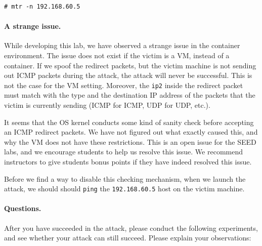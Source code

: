 \begin{lstlisting}
# mtr -n 192.168.60.5
\end{lstlisting}
 



\paragraph{A strange issue.} While developing this lab, we have observed
a strange issue in the container environment. The issue does not exist
if the victim is a VM, instead of a container. 
If we spoof the redirect packets, but the victim machine is not 
sending out ICMP packets during the attack, the attack will never be successful. 
This is not the case for the VM setting. 
Moreover, the \texttt{ip2} inside the redirect packet must match with the
type and the destination IP address of the packets 
that the victim is currently sending (ICMP for ICMP,
UDP for UDP, etc.). 


It seems that the OS kernel conducts some kind of 
sanity check before accepting an ICMP redirect packets. 
We have not figured out what exactly caused this, 
and why the VM does not have these restrictions. 
This is an open issue for the SEED labs, and we encourage 
students to help us resolve this issue. We recommend instructors
to give students bonus points if they have indeed resolved this issue. 


Before we find a way to disable this checking mechanism, 
when we launch the attack,
we should should \texttt{ping} the \texttt{192.168.60.5} host on the 
victim machine. 


\paragraph{Questions.} After you have succeeded in the attack, please 
conduct the following experiments, and see whether your attack can 
still succeed. Please explain your observations:

